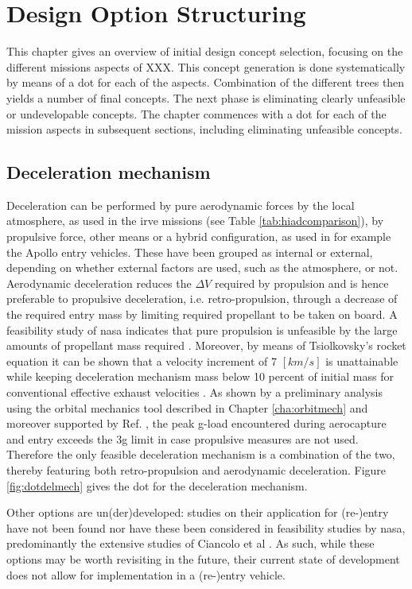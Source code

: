 \section{Design Option Structuring} \label{ch:design}
This chapter gives an overview of initial design concept selection, focusing on the different missions aspects of XXX. This concept generation is done systematically by means of a \gls{dot} for each of the aspects. Combination of the different trees then yields a number of final concepts. The next phase is eliminating clearly unfeasible or undevelopable concepts. The chapter commences with a \gls{dot} for each of the mission aspects in subsequent sections, including eliminating unfeasible concepts.

\subsection{Deceleration mechanism}
Deceleration can be performed by pure aerodynamic forces by the local atmosphere, as used in the \gls{irve} missions (see Table \ref{tab:hiadcomparison}), by propulsive force, other means or a hybrid configuration, as used in for example the Apollo entry vehicles. These have been grouped as internal or external, depending on whether external factors are used, such as the atmosphere, or not. Aerodynamic deceleration reduces the $\Delta V$ required by propulsion and is hence preferable to propulsive deceleration, i.e. retro-propulsion, through a decrease of the required entry mass by limiting required propellant to be taken on board. A feasibility study of \gls{nasa} indicates that pure propulsion is unfeasible by the large amounts of propellant mass required \cite{Ciancolo2010}. Moreover, by means of Tsiolkovsky's rocket equation it can be shown that a velocity increment of 7 $[km/s]$ is unattainable while keeping deceleration mechanism mass below 10 percent of initial mass for conventional effective exhaust velocities \cite{Wertz2011}. As shown by a preliminary analysis using the orbital mechanics tool described in Chapter \ref{cha:orbitmech} and moreover supported by Ref. \cite{Ciancolo2010}, the peak g-load encountered during aerocapture and entry exceeds the 3g limit in case propulsive measures are not used. Therefore the only feasible deceleration mechanism is a combination of the two, thereby featuring both retro-propulsion and aerodynamic deceleration. Figure \ref{fig:dotdelmech} gives the \gls{dot} for the deceleration mechanism.

Other options are un(der)developed: studies on their application for (re-)entry have not been found nor have these been considered in feasibility studies by \gls{nasa}, predominantly the extensive studies of Ciancolo et al \cite{Ciancolo2010}. As such, while these options may be worth revisiting in the future, their current state of development does not allow for implementation in a (re-)entry vehicle.

